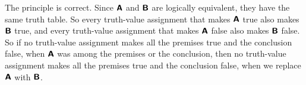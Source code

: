 \begin{small}
\begin{earg}
\begin{ebullet}
\item[] The principle is correct. Since $\bm{\mathsf{A}}$ and $\bm{\mathsf{B}}$ are logically equivalent, they have the same truth table. So every truth-value assignment that makes $\bm{\mathsf{A}}$ true also makes $\bm{\mathsf{B}}$ true, and every truth-value assignment that makes $\bm{\mathsf{A}}$ false also makes $\bm{\mathsf{B}}$ false. So if no truth-value assignment makes all the premises true and the conclusion false, when $\bm{\mathsf{A}}$ was among the premises or the conclusion, then no truth-value assignment makes all the premises true and the conclusion false, when we replace $\bm{\mathsf{A}}$ with $\bm{\mathsf{B}}$.
\end{ebullet}

\end{earg}
\end{small}
